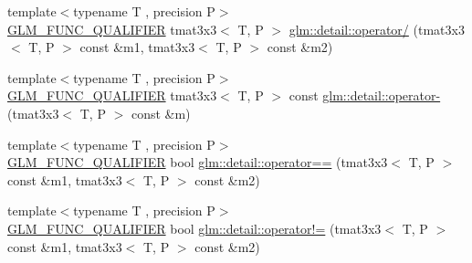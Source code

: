 \begin{DoxyCompactItemize}
\item 
{\footnotesize template$<$typename T , precision P$>$ }\\\hyperlink{setup_8hpp_a33fdea6f91c5f834105f7415e2a64407}{G\+L\+M\+\_\+\+F\+U\+N\+C\+\_\+\+Q\+U\+A\+L\+I\+F\+I\+ER} tmat3x3$<$ T, P $>$ \hyperlink{namespaceglm_1_1detail_a22d7c2d09a1889dc2d8af806409a7495}{glm\+::detail\+::operator/} (tmat3x3$<$ T, P $>$ const \&m1, tmat3x3$<$ T, P $>$ const \&m2)
\item 
{\footnotesize template$<$typename T , precision P$>$ }\\\hyperlink{setup_8hpp_a33fdea6f91c5f834105f7415e2a64407}{G\+L\+M\+\_\+\+F\+U\+N\+C\+\_\+\+Q\+U\+A\+L\+I\+F\+I\+ER} tmat3x3$<$ T, P $>$ const \hyperlink{namespaceglm_1_1detail_a70af38ec257104b27e6942f07e8a3b2c}{glm\+::detail\+::operator-\/} (tmat3x3$<$ T, P $>$ const \&m)
\item 
{\footnotesize template$<$typename T , precision P$>$ }\\\hyperlink{setup_8hpp_a33fdea6f91c5f834105f7415e2a64407}{G\+L\+M\+\_\+\+F\+U\+N\+C\+\_\+\+Q\+U\+A\+L\+I\+F\+I\+ER} bool \hyperlink{namespaceglm_1_1detail_a7d211f14fa16677924cf25b34ddac52b}{glm\+::detail\+::operator==} (tmat3x3$<$ T, P $>$ const \&m1, tmat3x3$<$ T, P $>$ const \&m2)
\item 
{\footnotesize template$<$typename T , precision P$>$ }\\\hyperlink{setup_8hpp_a33fdea6f91c5f834105f7415e2a64407}{G\+L\+M\+\_\+\+F\+U\+N\+C\+\_\+\+Q\+U\+A\+L\+I\+F\+I\+ER} bool \hyperlink{namespaceglm_1_1detail_a399deee1b1ca1ea41f8ea4a138e3a19f}{glm\+::detail\+::operator!=} (tmat3x3$<$ T, P $>$ const \&m1, tmat3x3$<$ T, P $>$ const \&m2)
\end{DoxyCompactItemize}
